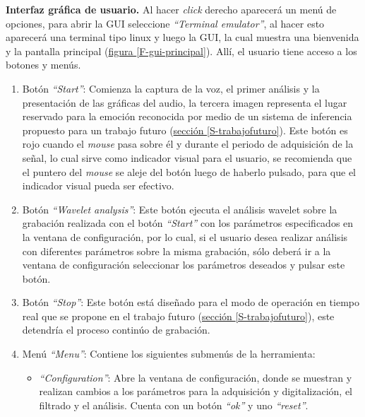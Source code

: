 \documentclass[11pt,lettersize]{article} %
\newcommand{\figura}[1]{\hyperref[{#1}]{figura \ref*{#1}}}
\newcommand{\seccion}[1]{\hyperref[{#1}]{sección \ref*{#1}}}
\begin{document}
\textbf{Interfaz gráfica de usuario.}
Al hacer \textit{click} derecho aparecerá un menú de opciones, para abrir la GUI seleccione \textit{``Terminal emulator''}, al hacer esto aparecerá una terminal tipo linux y luego la GUI, la cual muestra una bienvenida y la pantalla principal (\figura{F-gui-principal}). Allí, el usuario tiene acceso a los botones y menús.
\begin{enumerate}
	\item Botón \textit{``Start''}: Comienza la captura de la voz, el primer análisis y la presentación de las gráficas del audio, la tercera imagen representa el lugar reservado para la emoción reconocida por medio de un sistema de inferencia propuesto para un trabajo futuro (\seccion{S-trabajofuturo}). Este botón es rojo cuando el \textit{mouse} pasa sobre él y durante el periodo de adquisición de la señal, lo cual sirve como indicador visual para el usuario, se recomienda que el puntero del \textit{mouse} se aleje del botón luego de haberlo pulsado, para que el indicador visual pueda ser efectivo.
	\item Botón \textit{``Wavelet analysis''}: Este botón ejecuta el análisis wavelet sobre la grabación realizada con el botón \textit{``Start''} con los parámetros especificados en la ventana de configuración, por lo cual, si el usuario desea realizar análisis con diferentes parámetros sobre la misma grabación, sólo deberá ir a la ventana de configuración seleccionar los parámetros deseados y pulsar este botón.
	\item Botón \textit{``Stop''}: Este botón está diseñado para el modo de operación en tiempo real que se propone en el trabajo futuro (\seccion{S-trabajofuturo}), este detendría el proceso continúo de grabación.
	\item Menú \textit{``Menu''}: Contiene los siguientes submenús de la herramienta:
	\begin{itemize}
		\item \textit{``Configuration''}: Abre la ventana de configuración, donde se muestran y realizan cambios a los parámetros para la adquisición y digitalización, el filtrado y el análisis. Cuenta con un botón \textit{``ok''} y uno \textit{``reset''}.

\end{itemize}
\end{enumerate}
\end{document}
